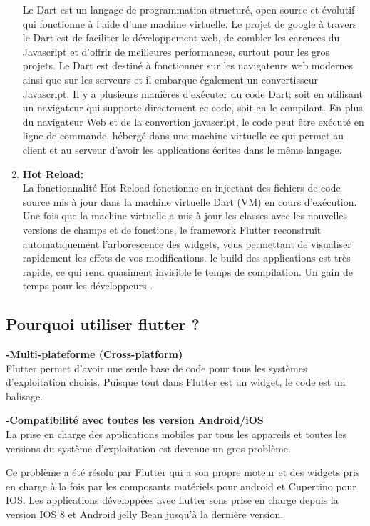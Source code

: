 \begin{enumerate}
        Le Dart est un langage de programmation structuré, open source et évolutif qui fonctionne à l'aide d'une machine virtuelle. Le projet de google à travers le Dart est de faciliter le développement web, de combler les carences du Javascript et d'offrir de meilleures performances, surtout pour les gros projets. Le Dart est destiné à fonctionner sur les navigateurs web modernes ainsi que sur les serveurs et il embarque également un convertisseur Javascript. Il y a plusieurs manières d'exécuter du code Dart; soit en utilisant un navigateur qui supporte directement ce code, soit en le compilant. En plus du navigateur Web et de la convertion javascript, le code peut être exécuté en ligne de commande, hébergé dans une machine virtuelle ce qui permet au client et au serveur d'avoir les applications écrites dans le même langage.~\cite{DartSUPINFOEcole}\bigskip
          \item \textbf{Hot Reload: }\\ 
          La fonctionnalité Hot Reload fonctionne en injectant des fichiers de code source mis à jour dans la machine virtuelle Dart (VM) en cours d'exécution. Une fois que la machine virtuelle a mis à jour les classes avec les nouvelles versions de champs et de fonctions, le framework Flutter reconstruit automatiquement l'arborescence des widgets, vous permettant de visualiser rapidement les effets de vos modifications. le build des applications est très rapide, ce qui rend quasiment invisible le temps de compilation. Un gain de temps pour les développeurs .
        \end{enumerate}          
\newpage

\subsection{Pourquoi utiliser flutter ?  }           
\textbf{-Multi-plateforme (Cross-platform)}\\
Flutter permet d'avoir une seule base de code pour tous les systèmes d'exploitation choisis. Puisque tout dans Flutter est un widget, le code est un balisage.\bigskip

\textbf{-Compatibilité avec toutes les version Android/iOS}\\
La prise en charge des applications mobiles par tous les appareils et toutes les versions du système d'exploitation est devenue un gros problème.

Ce problème a été résolu par Flutter qui a son propre moteur et des widgets pris en charge à la fois par les composants matériels pour android et Cupertino pour IOS. Les applications développées avec flutter sons prise en charge depuis la version IOS 8 et Android jelly Bean jusqu'à la dernière version.\bigskip

